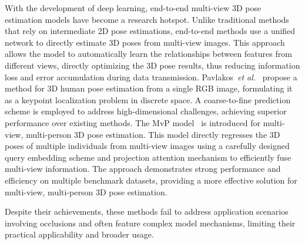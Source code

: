 With the development of deep learning, end-to-end multi-view 3D pose estimation models have become a research hotspot. 
Unlike traditional methods that rely on intermediate 2D pose estimations, end-to-end methods use a unified network to directly estimate 3D poses from multi-view images. 
This approach allows the model to automatically learn the relationships between features from different views, directly optimizing the 3D pose results, thus reducing information loss and error accumulation during data transmission. 
Pavlakos~\textit{et al.}~\cite{pavlakos2017coarse} propose a method for 3D human pose estimation from a single RGB image, formulating it as a keypoint localization problem in discrete space.
A coarse-to-fine prediction scheme is employed to address high-dimensional challenges, achieving superior performance over existing methods.
The MvP model~\cite{zhang2021direct} is introduced for multi-view, multi-person 3D pose estimation. 
This model directly regresses the 3D poses of multiple individuals from multi-view images using a carefully designed query embedding scheme and projection attention mechanism to efficiently fuse multi-view information. 
The approach demonstrates strong performance and efficiency on multiple benchmark datasets, providing a more effective solution for multi-view, multi-person 3D pose estimation.

Despite their achievements, these methods fail to address application scenarios involving occlusions and often feature complex model mechanisms, limiting their practical applicability and broader usage.

